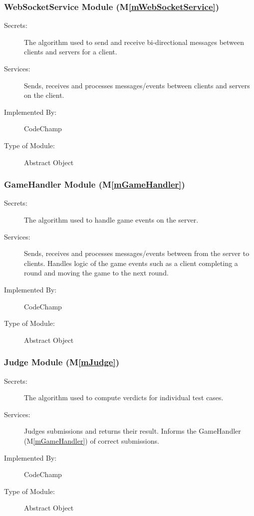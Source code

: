 \documentclass[12pt, titlepage]{article}
\newcommand{\mref}[1]{M\ref{#1}}
\begin{document}
\subsubsection{ WebSocketService Module (\mref{mWebSocketService})}

\begin{description}
\item[Secrets:] The algorithm used to send and receive bi-directional messages between clients and servers for a client.
\item[Services:] Sends, receives and processes messages/events between clients and servers on the client.
\item[Implemented By:] CodeChamp
\item[Type of Module:] Abstract Object
\end{description}

\subsubsection{ GameHandler Module (\mref{mGameHandler})}

\begin{description}
\item[Secrets:] The algorithm used to handle game events on the server.
\item[Services:] Sends, receives and processes messages/events between from the server to clients. Handles logic of the game events such as a client completing a round and moving the game to the next round.
\item[Implemented By:] CodeChamp
\item[Type of Module:] Abstract Object
\end{description}


\subsubsection{ Judge Module (\mref{mJudge})}

\begin{description}
\item[Secrets:] The algorithm used to compute verdicts for individual test cases.
\item[Services:] Judges submissions and returns their result. Informs the GameHandler (\mref{mGameHandler}) of correct submissions.
\item[Implemented By:] CodeChamp
\item[Type of Module:] Abstract Object
\end{description}
\end{document}
